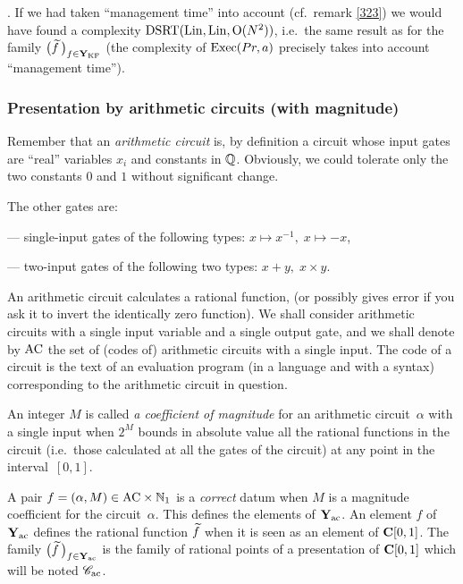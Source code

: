 . If we had taken ``management time'' into account (cf.\ remark 
\ref{323}) we would have found a complexity ${\rm DSRT}({\rm Lin}, {\rm Lin}, {\rm O}(N^2))$, i.e.\ the 
same result as for the family $\big(\widetilde{f}\,\big)_{f \in {{\bf Y}_{\rm KF}}}$ (the complexity of ${\rm Exec}(Pr,a)$ precisely takes into account ``management time'').

 \subsubsection{Presentation by arithmetic circuits (with 
magnitude)}\label{subsubsec 413}
Remember that an {\em arithmetic circuit} is, by definition a circuit whose input gates are ``real'' variables $x_i$ and constants in $\mathbb {Q}$. Obviously, we could tolerate only the two constants $0$ and $1$ without significant change. 

\noindent 
The other gates are:

\noindent 
--- single-input gates of the following types: $x \mapsto x^{-1}, \; x \mapsto -x$, 

\noindent 
--- two-input gates of the following two types: $x+y, \; x \times y$. 

\noindent 
An arithmetic circuit calculates a rational function, (or possibly gives error if you ask it to invert the identically zero function).
We shall consider arithmetic circuits with a single input variable and a single output gate, and we shall denote by ${\rm AC}$ the set of (codes of) arithmetic circuits with a single input. 
The code of a circuit is the text of an evaluation program (in a language and with a syntax) corresponding to the arithmetic circuit in question. 


\begin{definition} \label{4110}
An integer $M$ is called {\em a coefficient of magnitude} for an 
arithmetic circuit~$\alpha$ with a single input when $2^M$ bounds in absolute value 
all the rational functions in the circuit (i.e.\ those calculated at all  the gates of the circuit) at any point in the interval~$[0,1]$. 

\noindent 
A pair $f = (\alpha, M) \in {\rm AC} \times \mathbb {N}_1$ is a  \emph{correct}  datum when $M$ is  a magnitude coefficient for the circuit~$\alpha$. 
This defines the elements of ${{\bf Y}_{\rm ac}}$. An element $f$ of ${{\bf Y}_{\rm ac}}$ 
defines the rational function $\widetilde{f}$ when it is  
seen as an element of ${{\bf C}[0,1]}$. 
The family $\big(\widetilde{f}\,\big)_{f \in {{\bf Y}_{\rm ac}} }$ is the family of rational points of a presentation of ${{\bf C}[0,1]}$ which will be noted ${{{\mathscr C}}_{\rm ac}}$.
\end{definition} 

